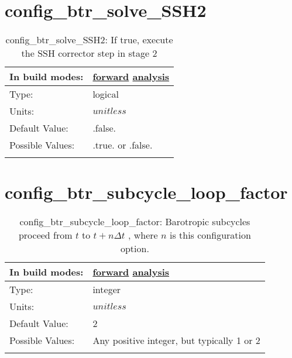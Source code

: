 \section[config\_btr\_solve\_SSH2]{config\_btr\_solve\_SSH2}
\label{sec:nm_sec_config_btr_solve_SSH2}
\begin{center}
\begin{longtable}{| p{2.0in} || p{4.0in} |}
    \hline
    In build modes: & \hyperref[subsec:forward_nm_tab_split_explicit_ts]{forward} \hyperref[subsec:analysis_nm_tab_split_explicit_ts]{analysis} \\
    \hline
    Type: & logical \\
    \hline
    Units: & $unitless$ \\
    \hline
    Default Value: & .false. \\
    \hline
    Possible Values: & .true. or .false. \\
    \hline
    \caption{config\_btr\_solve\_SSH2: If true, execute the SSH corrector step in stage 2}
\end{longtable}
\end{center}
\section[config\_btr\_subcycle\_loop\_factor]{config\_btr\_subcycle\_loop\_factor}
\label{sec:nm_sec_config_btr_subcycle_loop_factor}
\begin{center}
\begin{longtable}{| p{2.0in} || p{4.0in} |}
    \hline
    In build modes: & \hyperref[subsec:forward_nm_tab_split_explicit_ts]{forward} \hyperref[subsec:analysis_nm_tab_split_explicit_ts]{analysis} \\
    \hline
    Type: & integer \\
    \hline
    Units: & $unitless$ \\
    \hline
    Default Value: & 2 \\
    \hline
    Possible Values: & Any positive integer, but typically 1 or 2 \\
    \hline
    \caption{config\_btr\_subcycle\_loop\_factor:  Barotropic subcycles proceed from  $t$  to  $t+n\Delta t$ , where  $n$  is this configuration option.}
\end{longtable}
\end{center}
